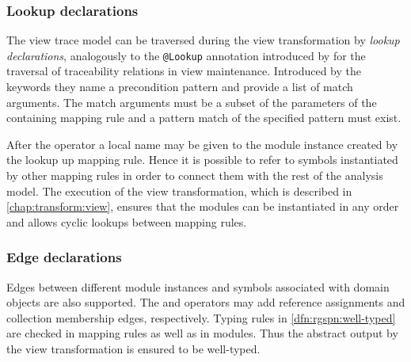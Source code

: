 \subsubsection{Lookup declarations}

The view trace model can be traversed during the view transformation by \emph{lookup declarations}, analogously to the \texttt{@Lookup} annotation introduced by \citet{Debreceni14viewmodel} for the traversal of traceability relations in view maintenance. Introduced by the keywords  they name a precondition pattern and provide a list of match arguments. The match arguments must be a subset of the parameters of the containing mapping rule and a pattern match of the specified pattern must exist.

After the operator \lit{=>} a local name may be given to the module instance created by the lookup up mapping rule. Hence it is possible to refer to symbols instantiated by other mapping rules in order to connect them with the rest of the analysis model. The execution of the view transformation, which is described in \vref{chap:transform:view}, ensures that the modules can be instantiated in any order and allows cyclic lookups between mapping rules.

\subsubsection{Edge declarations}

Edges between different  module instances and symbols associated with domain objects are also supported. The \lit{:=} and \lit{+=} operators may add reference assignments and collection membership edges, respectively. Typing rules in \vref{dfn:rgspn:well-typed} are checked in mapping rules as well as in  modules. Thus the abstract  output by the view transformation is ensured to be well-typed.

